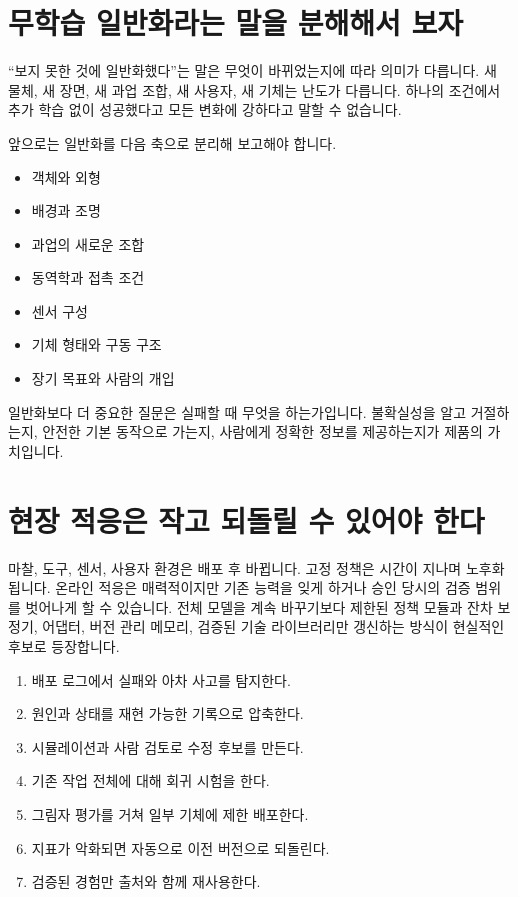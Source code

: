 \documentclass[11pt,openany]{book}
\begin{document}
\section{무학습 일반화라는 말을 분해해서 보자}

``보지 못한 것에 일반화했다''는 말은 무엇이 바뀌었는지에 따라 의미가 다릅니다. 새 물체, 새 장면, 새 과업 조합, 새 사용자, 새 기체는 난도가 다릅니다. 하나의 조건에서 추가 학습 없이 성공했다고 모든 변화에 강하다고 말할 수 없습니다.

앞으로는 일반화를 다음 축으로 분리해 보고해야 합니다.

\begin{itemize}
  \item 객체와 외형
  \item 배경과 조명
  \item 과업의 새로운 조합
  \item 동역학과 접촉 조건
  \item 센서 구성
  \item 기체 형태와 구동 구조
  \item 장기 목표와 사람의 개입
\end{itemize}

일반화보다 더 중요한 질문은 실패할 때 무엇을 하는가입니다. 불확실성을 알고 거절하는지, 안전한 기본 동작으로 가는지, 사람에게 정확한 정보를 제공하는지가 제품의 가치입니다.

\section{현장 적응은 작고 되돌릴 수 있어야 한다}

마찰, 도구, 센서, 사용자 환경은 배포 후 바뀝니다. 고정 정책은 시간이 지나며 노후화됩니다. 온라인 적응은 매력적이지만 기존 능력을 잊게 하거나 승인 당시의 검증 범위를 벗어나게 할 수 있습니다. 전체 모델을 계속 바꾸기보다 제한된 정책 모듈과 잔차 보정기, 어댑터, 버전 관리 메모리, 검증된 기술 라이브러리만 갱신하는 방식이 현실적인 후보로 등장합니다.

\begin{fieldbox}
\begin{enumerate}
  \item 배포 로그에서 실패와 아차 사고를 탐지한다.
  \item 원인과 상태를 재현 가능한 기록으로 압축한다.
  \item 시뮬레이션과 사람 검토로 수정 후보를 만든다.
  \item 기존 작업 전체에 대해 회귀 시험을 한다.
  \item 그림자 평가를 거쳐 일부 기체에 제한 배포한다.
  \item 지표가 악화되면 자동으로 이전 버전으로 되돌린다.
  \item 검증된 경험만 출처와 함께 재사용한다.
\end{enumerate}
\end{fieldbox}
\end{document}
